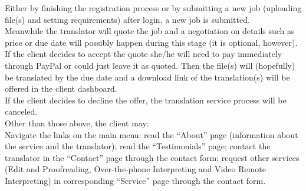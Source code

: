 \documentclass{l3proj}
\begin{document}
Either by finishing the registration process or by submitting a new job
(uploading file(s) and setting requirements) after login, a new job is
submitted.\\

Meanwhile the translator will quote the job and a negotiation on details such as
price or due date will possibly happen during this stage (it is optional,
however).\\

If the client decides to accept the quote she/he will need to pay immediately
through PayPal or could just leave it as quoted. Then the file(s) will
(hopefully) be translated by the due date and a download link of the
translation(s) will be offered in the client dashboard.\\

If the client decides to decline the offer, the translation service process will
be canceled.\\

Other than those above, the client may: \\

	Navigate the links on the main menu: read the “About” page (information
about the service and the translator); read the “Testimonials” page; contact the
translator in the “Contact” page through the contact form; request other
services (Edit and Proofreading, Over-the-phone Interpreting and Video Remote
Interpreting) in corresponding “Service” page through the contact form. \\


\newpage
\end{document}
